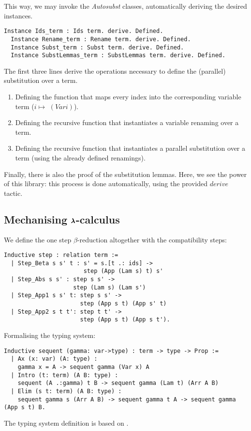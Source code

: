 This way, we may invoke the \textit{Autosubst} classes, automatically deriving the desired instances.

\begin{lstlisting}[language=Coq]
  Instance Ids_term : Ids term. derive. Defined.
  Instance Rename_term : Rename term. derive. Defined.
  Instance Subst_term : Subst term. derive. Defined.
  Instance SubstLemmas_term : SubstLemmas term. derive. Defined.
\end{lstlisting}

The first three lines derive the operations necessary to define the (parallel) substitution over a term.
\begin{enumerate}
\item Defining the function that maps every index into the corresponding variable term ($i \mapsto $ \lst$(Var i)$).
\item Defining the recursive function that instantiates a variable renaming over a term.
\item Defining the recursive function that instantiates a parallel substitution over a term (using the already defined renamings).
\end{enumerate}

Finally, there is also the proof of the substitution lemmas. 
Here, we see the power of this library: this process is done automatically, using the provided \lst$derive$ tactic.

\subsection{Mechanising $\pmb{\lambda}$-calculus}

We define the one step $\beta$-reduction altogether with the compatibility steps:
\begin{lstlisting}[language=Coq]
  Inductive step : relation term :=
  | Step_Beta s s' t : s' = s.[t .: ids] ->
                       step (App (Lam s) t) s'
  | Step_Abs s s' : step s s' ->
                    step (Lam s) (Lam s')
  | Step_App1 s s' t: step s s' ->
                      step (App s t) (App s' t)
  | Step_App2 s t t': step t t' ->
                      step (App s t) (App s t').
\end{lstlisting}

Formalising the typing system:

\begin{lstlisting}[language=Coq]
  Inductive sequent (gamma: var->type) : term -> type -> Prop := 
  | Ax (x: var) (A: type) :
    gamma x = A -> sequent gamma (Var x) A
  | Intro (t: term) (A B: type) :
    sequent (A .:gamma) t B -> sequent gamma (Lam t) (Arr A B)
  | Elim (s t: term) (A B: type) :
    sequent gamma s (Arr A B) -> sequent gamma t A -> sequent gamma (App s t) B.
\end{lstlisting}

The typing system definition is based on \cite{AutosubstManual}.


